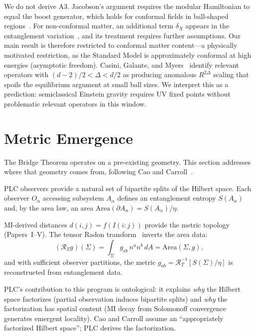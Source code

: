 \documentclass[aps,pra,twocolumn,superscriptaddress,floatfix]{revtex4-2}
\begin{document}
We do not derive A3.
Jacobson's argument requires the modular Hamiltonian to equal the boost generator, which holds for conformal fields in ball-shaped regions~\cite{casini2011,hislop1982}.
For non-conformal matter, an additional term $\delta_X$ appears in the entanglement variation~\cite{jacobson2015}, and its treatment requires further assumptions.
Our main result is therefore restricted to conformal matter content---a physically motivated restriction, as the Standard Model is approximately conformal at high energies (asymptotic freedom).
Casini, Galante, and Myers~\cite{casini2016} identify relevant operators with $(d-2)/2 < \Delta < d/2$ as producing anomalous $R^{2\Delta}$ scaling that spoils the equilibrium argument at small ball sizes.
We interpret this as a prediction: semiclassical Einstein gravity requires UV fixed points without problematic relevant operators in this window.


\section{Metric Emergence}
\label{sec:metric}

The Bridge Theorem operates on a pre-existing geometry.
This section addresses where that geometry comes from, following Cao and Carroll~\cite{cao2018}.

PLC observers provide a natural set of bipartite splits of the Hilbert space.
Each observer $O_\alpha$ accessing subsystem $A_\alpha$ defines an entanglement entropy $S(A_\alpha)$ and, by the area law, an area $\mathrm{Area}(\partial A_\alpha) = S(A_\alpha)/\eta$.

MI-derived distances $d(i,j) = f(I(i\!:\!j))$ provide the metric topology (Papers~I--V).
The tensor Radon transform~\cite{cao2018} inverts the area data:
\begin{equation}
(\mathcal{R}_T g)(\Sigma) = \int_\Sigma g_{ab} \, n^a n^b \, dA = \mathrm{Area}(\Sigma, g),
\end{equation}
and with sufficient observer partitions, the metric $g_{ab} = \mathcal{R}_T^{-1}[S(\Sigma)/\eta]$ is reconstructed from entanglement data.

PLC's contribution to this program is ontological: it explains \emph{why} the Hilbert space factorizes (partial observation induces bipartite splits) and \emph{why} the factorization has spatial content (MI decay from Solomonoff convergence generates emergent locality).
Cao and Carroll assume an ``appropriately factorized Hilbert space''; PLC derives the factorization.
\end{document}
